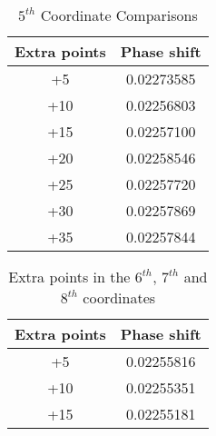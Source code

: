 \documentclass[Dissertation.tex]{subfiles}
\begin{document}
\begin{table}[H]
\centering
\begin{tabular}{c c}
\toprule
Extra points & Phase shift \\
\midrule
+5 & 0.02273585 \\
+10 & 0.02256803 \\
+15 & 0.02257100 \\
+20 & 0.02258546 \\
+25 & 0.02257720 \\
+30 & 0.02257869 \\
+35 & 0.02257844 \\
\bottomrule
\end{tabular}
\caption{$5^{th}$ Coordinate Comparisons}
\label{tab:5thcoordExtraPoints}
\end{table}


\begin{table}[H]
\centering
\begin{tabular}{c c}
\toprule
Extra points & Phase shift \\
\midrule
+5 & 0.02255816 \\
+10 & 0.02255351 \\
+15 & 0.02255181 \\
\bottomrule
\end{tabular}
\caption{Extra points in the $6^{th}$, $7^{th}$ and $8^{th}$ coordinates}
\label{tab:678thcoordExtraPoints}
\end{table}



\biblio
\end{document}

